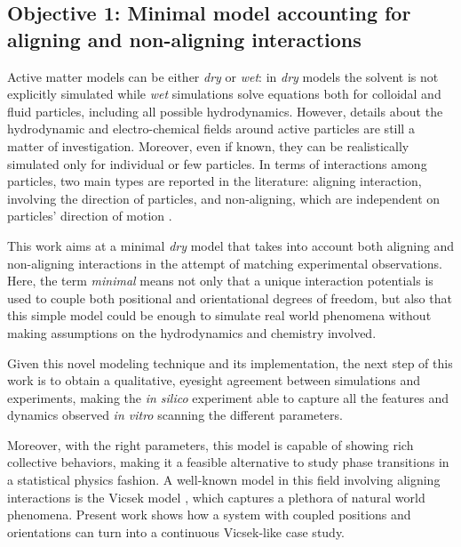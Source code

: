\documentclass[../../master_thesis_np.tex]{subfiles}
\begin{document}
	\subsection{Objective 1: Minimal model accounting for aligning and non-aligning interactions}
	Active matter models can be either \emph{dry} or \emph{wet}: in \emph{dry} models the solvent is not explicitly simulated while \emph{wet} simulations solve equations both for colloidal and fluid particles, including all possible hydrodynamics. 
	However, details about the hydrodynamic and electro-chemical fields around active particles are still a matter of investigation.
	Moreover, even if known, they can be realistically simulated only for individual or few particles.
	In terms of interactions among particles, two main types are reported in the literature: aligning interaction, involving the direction of particles, and non-aligning, which are independent on particles' direction of motion \cite{callegari_numerical_2019}.
	
	This work aims at a minimal \emph{dry} model that takes into account both aligning and non-aligning interactions in the attempt of matching experimental observations.
	Here, the term \emph{minimal} means not only that a unique interaction potentials is used to couple both positional and orientational degrees of freedom, but also that this simple model could be enough to simulate real world phenomena without making assumptions on the hydrodynamics and chemistry involved. 
		
	Given this novel modeling technique and its implementation, the next step of this work is to obtain a qualitative, eyesight agreement between simulations and experiments, making the \emph{in silico} experiment able to capture all the features and dynamics observed \emph{in vitro} scanning the different parameters.
	
	Moreover, with the right parameters, this model is capable of showing rich collective behaviors, making it a feasible alternative to study phase transitions in a statistical physics fashion. 
	A well-known model in this field involving aligning interactions is the Vicsek model \cite{vicsek_novel_1995}, which captures a plethora of natural world phenomena. 
	Present work shows how a system with coupled positions and orientations can turn into a continuous Vicsek-like case study.
	
\end{document}
